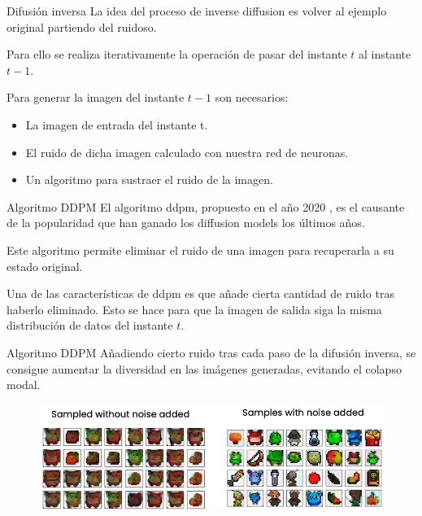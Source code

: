 \begin{frame}{Difusión inversa}
La idea del proceso de inverse diffusion es volver al \alert{ejemplo original} partiendo del \alert{ruidoso}. 

Para ello se realiza \alert{iterativamente} la operación de pasar del instante \alert{$t$} al instante \alert{$t-1$}.

Para generar la imagen del instante \alert{$t-1$} son necesarios:
\begin{itemize}
    \item La \alert{imagen de entrada} del instante \alert{t}.
    \item El \alert{ruido} de dicha imagen calculado con nuestra red de neuronas.
    \item Un algoritmo para \alert{sustraer} el ruido de la imagen.
\end{itemize}
\end{frame}

\begin{frame}{Algoritmo DDPM}
El algoritmo \gls{ddpm}, propuesto en el año 2020 \cite{ho2020denoising}, es el \alert{causante de la popularidad} que han ganado los diffusion models los últimos años.

Este algoritmo permite \alert{eliminar} el ruido de una imagen para recuperarla a su estado original.

Una de las características de \gls{ddpm} es que añade \alert{cierta cantidad de ruido} tras haberlo eliminado. Esto se hace para que la imagen de salida siga la misma \alert{distribución de datos} del instante $t$.
\end{frame}

\begin{frame}{Algoritmo DDPM}
Añadiendo cierto ruido tras cada paso de la difusión inversa, se consigue aumentar la \alert{diversidad} en las imágenes generadas, evitando el colapso modal.

\begin{figure}
    \centering
    \includegraphics[width=\textwidth]{figures/Diffusion_Models/DDPM_Variation.png}
    \caption{\cite{DeepLearningDifussionModelCourse}}
\end{figure}
\end{frame}

